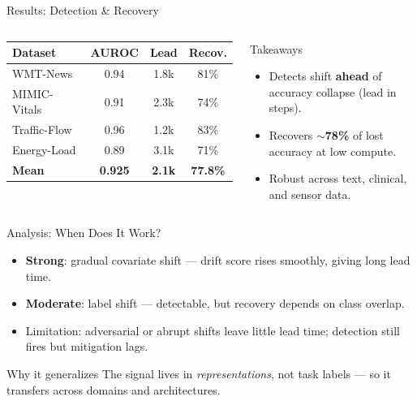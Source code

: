 \documentclass[aspectratio=169,11pt]{beamer}
\begin{document}

\begin{frame}{Results: Detection \& Recovery}
  \begin{columns}[T]
      \begin{table}
        \footnotesize
        \begin{tabular}{@{}lccc@{}}
          \toprule
          \textbf{Dataset} & \textbf{AUROC} & \textbf{Lead} & \textbf{Recov.}\\
          \midrule
          WMT-News     & 0.94 & 1.8k & 81\%\\
          MIMIC-Vitals & 0.91 & 2.3k & 74\%\\
          Traffic-Flow & 0.96 & 1.2k & 83\%\\
          Energy-Load  & 0.89 & 3.1k & 71\%\\
          \midrule
          \textbf{Mean} & \textbf{0.925} & \textbf{2.1k} & \textbf{77.8\%}\\
          \bottomrule
        \end{tabular}
      \end{table}
      \begin{block}{Takeaways}
        \begin{itemize}\footnotesize
          \item Detects shift \textbf{ahead} of accuracy collapse (lead in steps).
          \item Recovers \textbf{$\sim$78\%} of lost accuracy at low compute.
          \item Robust across text, clinical, and sensor data.
        \end{itemize}
      \end{block}
  \end{columns}
\end{frame}

\begin{frame}{Analysis: When Does It Work?}
  \begin{itemize}
    \item \textbf{Strong}: gradual covariate shift --- drift score rises smoothly, giving
      long lead time.
    \item \textbf{Moderate}: label shift --- detectable, but recovery depends on class
      overlap.
    \item \alert{Limitation}: adversarial or abrupt shifts leave little lead time; detection
      still fires but mitigation lags.
  \end{itemize}
  \begin{block}{Why it generalizes}
    The signal lives in \emph{representations}, not task labels --- so it transfers across
    domains and architectures.
  \end{block}
\end{frame}
\end{document}
